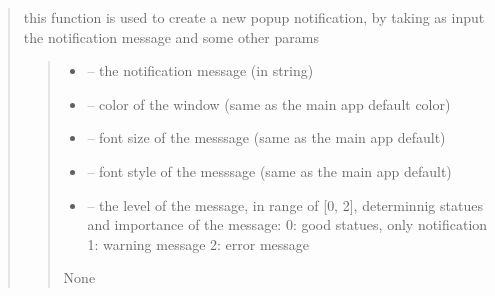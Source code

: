 \documentclass[letterpaper,10pt,english]{sphinxmanual}
\begin{document}
\begin{quote}
\begin{savenotes}
\begin{fulllineitems}

\begin{savenotes}\begin{fulllineitems}
\label{\detokenize{setting/notif_UI:oxin.notif_UI.notification_manager.create_new_notif}}
\pysigstartsignatures
{}
\pysigstopsignatures
\sphinxAtStartPar
this function is used to create a new pop\sphinxhyphen{}up notification, by taking as input the notification message and some other params
\begin{quote}\begin{description}
\begin{itemize}
\item {} 
\sphinxAtStartPar
{} – the notification message (in string)

\item {} 
\sphinxAtStartPar
{} – color of the window (same as the main app default color)

\item {} 
\sphinxAtStartPar
{} – font size of the messsage (same as the main app default)

\item {} 
\sphinxAtStartPar
{} – font style of the messsage (same as the main app default)

\item {} 
\sphinxAtStartPar
{} – the level of the message, in range of {[}0, 2{]}, determinnig statues and importance of the message:
0: good statues, only notification
1: warning message
2: error message

\end{itemize}

\sphinxAtStartPar
None


\end{description}
\end{quote}
\end{fulllineitems}
\end{savenotes}
\end{fulllineitems}
\end{savenotes}
\end{quote}
\end{document}
